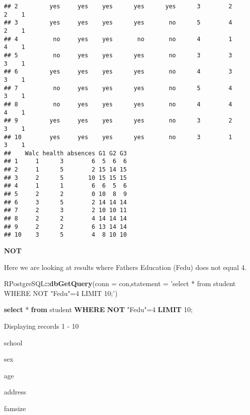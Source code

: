 \documentclass[]{book}
\newenvironment{Shaded}{\begin{snugshade}}{\end{snugshade}}
\newcommand{\KeywordTok}[1]{\textcolor[rgb]{0.13,0.29,0.53}{\textbf{#1}}}
\newcommand{\DataTypeTok}[1]{\textcolor[rgb]{0.13,0.29,0.53}{#1}}
\newcommand{\DecValTok}[1]{\textcolor[rgb]{0.00,0.00,0.81}{#1}}
\newcommand{\StringTok}[1]{\textcolor[rgb]{0.31,0.60,0.02}{#1}}
\newcommand{\OtherTok}[1]{\textcolor[rgb]{0.56,0.35,0.01}{#1}}
\newcommand{\OperatorTok}[1]{\textcolor[rgb]{0.81,0.36,0.00}{\textbf{#1}}}
\newcommand{\NormalTok}[1]{#1}
\begin{document}
\begin{verbatim}
## 2         yes     yes    yes      yes      yes      3        2     2    1
## 3         yes     yes    yes      yes       no      5        4     2    1
## 4          no     yes    yes       no       no      4        1     4    1
## 5          no     yes    yes      yes       no      3        3     3    1
## 6         yes     yes    yes      yes       no      4        3     3    1
## 7          no     yes    yes      yes       no      5        4     3    1
## 8          no     yes    yes      yes       no      4        4     4    1
## 9         yes     yes    yes      yes       no      3        2     3    1
## 10        yes     yes    yes      yes       no      3        1     3    1
##    Walc health absences G1 G2 G3
## 1     1      3        6  5  6  6
## 2     1      5        2 15 14 15
## 3     2      5       10 15 15 15
## 4     1      1        6  6  5  6
## 5     2      2        0 10  8  9
## 6     3      5        2 14 14 14
## 7     2      3        2 10 10 11
## 8     2      2        4 14 14 14
## 9     2      2        6 13 14 14
## 10    3      5        4  8 10 10
\end{verbatim}

\textbf{NOT}

Here we are looking at results where Fathers Education (Fedu) does not
equal 4.

\begin{Shaded}
\begin{Highlighting}[]
\NormalTok{RPostgreSQL}\OperatorTok{::}\KeywordTok{dbGetQuery}\NormalTok{(}\DataTypeTok{conn =}\NormalTok{ con,}\DataTypeTok{statement =} \StringTok{'select * from student WHERE NOT "Fedu"=4 LIMIT 10;'}\NormalTok{)}
\end{Highlighting}
\end{Shaded}

\begin{Shaded}
\begin{Highlighting}[]
\KeywordTok{select}\NormalTok{ * }\KeywordTok{from}\NormalTok{ student }\KeywordTok{WHERE} \KeywordTok{NOT} \OtherTok{"Fedu"}\NormalTok{=}\DecValTok{4} \KeywordTok{LIMIT} \DecValTok{10}\NormalTok{;}
\end{Highlighting}
\end{Shaded}

\label{tab:unnamed-chunk-30}Displaying records 1 - 10

school

sex

age

address

famsize
\end{document}
